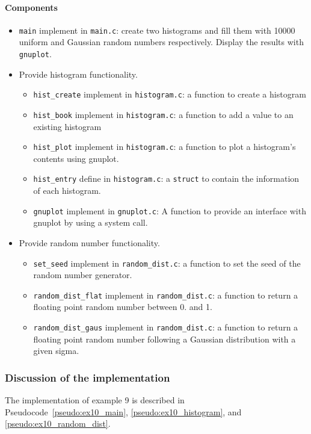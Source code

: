 \documentclass[11pt]{scrartcl}
\def\psc{Pseudocode}
\begin{document}
\paragraph{Components}
\begin{itemize}
\item \texttt{main} implement in \texttt{main.c}: 
create two histograms and fill them with 10000 uniform and Gaussian
random numbers respectively.  Display the results with
\texttt{gnuplot}.
%
\item Provide histogram functionality.
\begin{itemize}
\item \texttt{hist\_create} implement in \texttt{histogram.c}:
a function to create a histogram 
%
\item \texttt{hist\_book} implement in \texttt{histogram.c}:
a function to add a value to an existing histogram 
%
\item \texttt{hist\_plot} implement in \texttt{histogram.c}:
a function to plot a histogram's contents using gnuplot. 
%
\item \texttt{hist\_entry} define in \texttt{histogram.c}:
a \texttt{struct} to contain the information of each histogram.
%
\item \texttt{gnuplot} implement in \texttt{gnuplot.c}: 
A function to provide an interface with gnuplot by using a system
call.
%
\end{itemize}
%
\item Provide random number  functionality.
\begin{itemize}
\item \texttt{set\_seed} implement in \texttt{random\_dist.c}:
a function to set the seed of the random number generator.
%
\item \texttt{random\_dist\_flat} implement in
\texttt{random\_dist.c}:
a function to return a floating point random number between 0. and 1.
%
\item \texttt{random\_dist\_gaus} implement in
\texttt{random\_dist.c}:
a function to return a floating point random number following a
Gaussian distribution with a given sigma.
\end{itemize}
\end{itemize}

\subsubsection*{Discussion of the implementation}
The implementation of example 9 is described in
\psc~\ref{pseudo:ex10_main}, \ref{pseudo:ex10_histogram}, and
\ref{pseudo:ex10_random_dist}.
\end{document}

